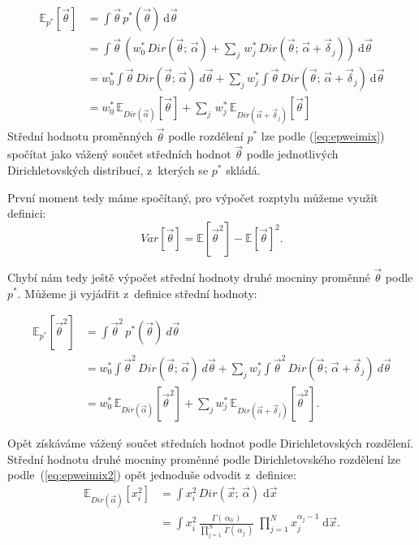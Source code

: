 \begin{align}
\mathbb{E}_{p^*}[\vec\theta] &= \int \vec\theta \, p^*(\vec\theta) ~ \mathrm{d}\vec\theta
\\
&= \int \vec\theta \, (
	w_0^* \, Dir(\vec{\theta};\, \vec{\alpha}) +
	\sum_j \, w^*_j \,
        	Dir(\vec{\theta};\, \vec{\alpha} + \vec{\delta}_j)
    ) ~ \mathrm{d}\vec\theta
\\
&= w_0^* \int \vec\theta \, Dir(\vec{\theta};\, \vec{\alpha}) ~ d\vec\theta +
	\sum_j w_j^* \int \vec\theta \, Dir(\vec{\theta};\, \vec{\alpha} + \vec{\delta}_j)
    ~ \mathrm{d}\vec\theta
\\
&= w_0^* \, \mathbb{E}_{Dir(\vec\alpha)}[\vec\theta] +
	\sum_j \, w_j^* \, \mathbb{E}_{Dir(\vec\alpha + \vec{\delta}_j)}[\vec\theta]
\label{eq:epweimix}
\end{align}
Střední hodnotu proměnných $\vec\theta$ podle rozdělení $p^*$ lze podle (\ref{eq:epweimix}) spočítat
jako vážený součet středních hodnot $\vec\theta$ podle jednotlivých
Dirichletovských distribucí, z~kterých se $p^*$ skládá.

První moment tedy máme spočítaný, pro výpočet rozptylu můžeme využít
definici:
\begin{equation}
	Var[\vec{\theta}] = \mathbb{E}[\vec{\theta}^2] - \mathbb{E}[\vec\theta]^2.
\end{equation}

Chybí nám tedy ještě výpočet střední hodnoty druhé mocniny proměnné
$\vec\theta$ podle $p^*$. Můžeme ji vyjádřit z~definice střední hodnoty:

\begin{align}
\mathbb{E}_{p^*}[\vec\theta^2] &= \int \vec\theta^2 \, p^*(\vec\theta) ~ d\vec\theta
\\
&= w_0^* \int \vec\theta^2 \, Dir(\vec{\theta};\, \vec{\alpha}) ~ d\vec\theta +
	\sum_j w_j^* \int \vec\theta^2 \, Dir(\vec{\theta};\, \vec{\alpha} + \vec{\delta}_j)
	 ~ d\vec\theta
\\
&= w_0^* \, \mathbb{E}_{Dir(\vec\alpha)}[\vec\theta^2] +
	\sum_j w_j^* \, \mathbb{E}_{Dir(\vec\alpha + \vec{\delta}_j)}[\vec\theta^2].
\label{eq:epweimix2}
\end{align}

Opět získáváme vážený součet středních hodnot podle Dirichletovských rozdělení.
Střední hodnotu druhé mocniny proměnné podle Dirichletovského rozdělení
lze podle~(\ref{eq:epweimix2}) opět jednoduše odvodit z~definice:
\begin{align}
\mathbb{E}_{Dir(\vec\alpha)}[x_i^2] &=
	\int x_i^2 \, Dir(\vec x; \, \vec\alpha) \; \mathrm{d}\vec x
\\
&=
	\int x_i^2 \, \frac{\Gamma(\,\alpha_0\,)}
			   {\prod_{j=1}^N \, \Gamma(\,\alpha_j\,)} \;
		\prod_{j=1}^N x_j^{\alpha_j - 1} \; \mathrm{d}\vec x.
\end{align}


